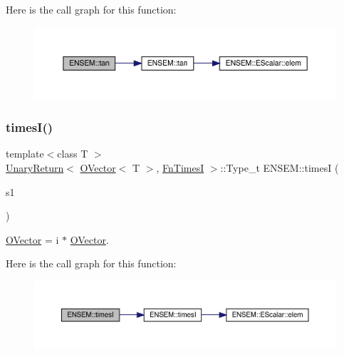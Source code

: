 Here is the call graph for this function\+:\nopagebreak
\begin{figure}[H]
\begin{center}
\leavevmode
\includegraphics[width=350pt]{da/d59/group__obsvector_gaf380b1c371f0b85fa8b4f4e207fa15de_cgraph}
\end{center}
\end{figure}
\mbox{\label{group__obsvector_gae21f93a0579f899ea525fd69333d5381}} 
\subsubsection{\texorpdfstring{timesI()}{timesI()}}
{\footnotesize\ttfamily template$<$class T $>$ \\
\mbox{\hyperlink{structENSEM_1_1UnaryReturn}{Unary\+Return}}$<$ \mbox{\hyperlink{classENSEM_1_1OVector}{O\+Vector}}$<$ T $>$, \mbox{\hyperlink{structENSEM_1_1FnTimesI}{Fn\+TimesI}} $>$\+::Type\+\_\+t E\+N\+S\+E\+M\+::timesI (\begin{DoxyParamCaption}\item[{const \mbox{\hyperlink{classENSEM_1_1OVector}{O\+Vector}}$<$ T $>$ \&}]{s1 }\end{DoxyParamCaption})\hspace{0.3cm}{\ttfamily [inline]}}



\mbox{\hyperlink{classENSEM_1_1OVector}{O\+Vector}} = i $\ast$ \mbox{\hyperlink{classENSEM_1_1OVector}{O\+Vector}}. 

Here is the call graph for this function\+:\nopagebreak
\begin{figure}[H]
\begin{center}
\leavevmode
\includegraphics[width=350pt]{da/d59/group__obsvector_gae21f93a0579f899ea525fd69333d5381_cgraph}
\end{center}
\end{figure}
\mbox{\label{group__obsvector_ga54c8e8c422afecbe2b647d021d931efb}} 
